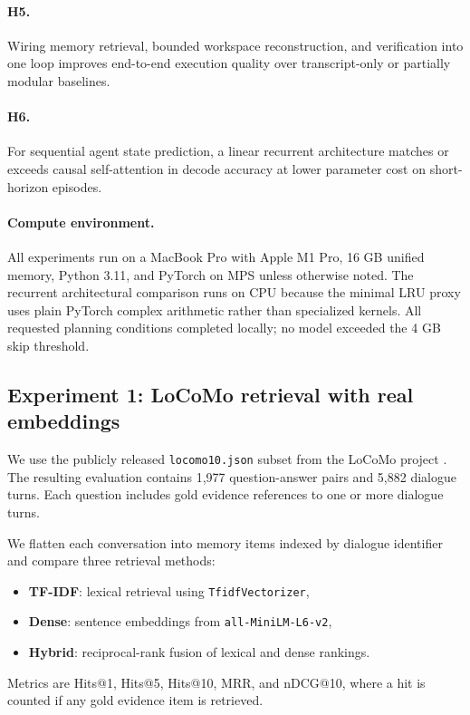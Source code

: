 \documentclass[11pt]{article}
\begin{document}
\paragraph{H5.} Wiring memory retrieval, bounded workspace reconstruction, and verification into one loop improves end-to-end execution quality over transcript-only or partially modular baselines.

\paragraph{H6.} For sequential agent state prediction, a linear recurrent architecture matches or exceeds causal self-attention in decode accuracy at lower parameter cost on short-horizon episodes.

\paragraph{Compute environment.} All experiments run on a MacBook Pro with Apple M1 Pro, 16 GB unified memory, Python 3.11, and PyTorch on MPS unless otherwise noted. The recurrent architectural comparison runs on CPU because the minimal LRU proxy uses plain PyTorch complex arithmetic rather than specialized kernels. All requested planning conditions completed locally; no model exceeded the 4 GB skip threshold.

\subsection{Experiment 1: LoCoMo retrieval with real embeddings}
We use the publicly released \texttt{locomo10.json} subset from the LoCoMo project \citep{locomo2024}. The resulting evaluation contains 1,977 question-answer pairs and 5,882 dialogue turns. Each question includes gold evidence references to one or more dialogue turns.

We flatten each conversation into memory items indexed by dialogue identifier and compare three retrieval methods:
\begin{itemize}
    \item \textbf{TF-IDF}: lexical retrieval using \texttt{TfidfVectorizer},
    \item \textbf{Dense}: sentence embeddings from \texttt{all-MiniLM-L6-v2},
    \item \textbf{Hybrid}: reciprocal-rank fusion of lexical and dense rankings.
\end{itemize}
Metrics are Hits@1, Hits@5, Hits@10, MRR, and nDCG@10, where a hit is counted if any gold evidence item is retrieved.
\end{document}
